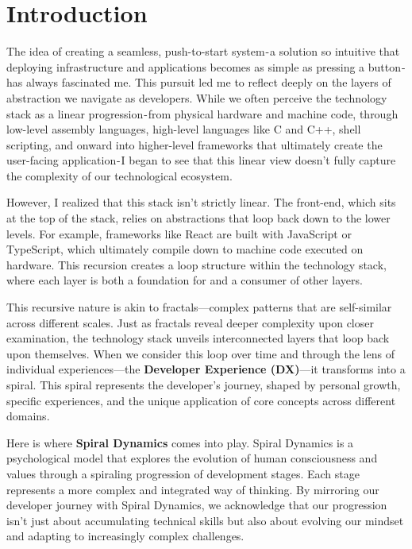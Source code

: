 \documentclass[../../main.tex]{subfiles}
\begin{document}
    \section{Introduction}

    The idea of creating a seamless, push-to-start system - a solution so intuitive that deploying infrastructure and applications becomes as simple as pressing a button - has always fascinated me. This pursuit led me to reflect deeply on the layers of abstraction we navigate as developers. While we often perceive the technology stack as a linear progression - from physical hardware and machine code, through low-level assembly languages, high-level languages like C and C++, shell scripting, and onward into higher-level frameworks that ultimately create the user-facing application - I began to see that this linear view doesn't fully capture the complexity of our technological ecosystem.

    However, I realized that this stack isn't strictly linear. The front-end, which sits at the top of the stack, relies on abstractions that loop back down to the lower levels. For example, frameworks like React are built with JavaScript or TypeScript, which ultimately compile down to machine code executed on hardware. This recursion creates a loop structure within the technology stack, where each layer is both a foundation for and a consumer of other layers.

    This recursive nature is akin to fractals—complex patterns that are self-similar across different scales. Just as fractals reveal deeper complexity upon closer examination, the technology stack unveils interconnected layers that loop back upon themselves. When we consider this loop over time and through the lens of individual experiences—the \textbf{Developer Experience (DX)}—it transforms into a spiral. This spiral represents the developer's journey, shaped by personal growth, specific experiences, and the unique application of core concepts across different domains.

    Here is where \textbf{Spiral Dynamics} comes into play. Spiral Dynamics is a psychological model that explores the evolution of human consciousness and values through a spiraling progression of development stages. Each stage represents a more complex and integrated way of thinking. By mirroring our developer journey with Spiral Dynamics, we acknowledge that our progression isn't just about accumulating technical skills but also about evolving our mindset and adapting to increasingly complex challenges.
\end{document}
